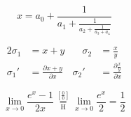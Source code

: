 \documentclass[a5paper]{book}
\begin{document}
\begin{equation}
  x = a_0 + \frac{1}{\displaystyle a_1
          + \frac{1}{\displaystyle a_2
          + \frac{1}{\displaystyle a_3 + a_4}}}
\end{equation}

\begin{alignat}{2}
 \sigma_1 &= x + y  &\quad \sigma_2 &= \frac{x}{y} \\
 \sigma_1' &= \frac{\partial x + y}{\partial x} & \sigma_2'
    &= \frac{\partial \frac{x}{y}}{\partial x}
\end{alignat}



\[
 \lim_{x\to 0}{\frac{e^x-1}{2x}}
 \overset{\left[\frac{0}{0}\right]}{\underset{\mathrm{H}}{=}}
 \lim_{x\to 0}{\frac{e^x}{2}}={\frac{1}{2}}
\]
\end{document}
